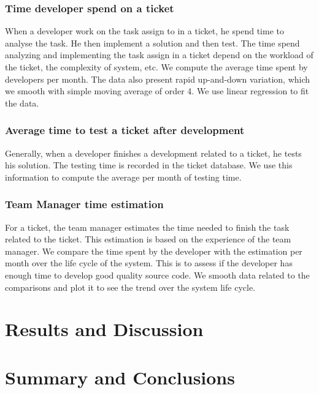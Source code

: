 \documentclass[10pt,conference]{IEEEtran}
\begin{document}
\subsubsection{Time developer spend on a ticket }
When a developer work on the task assign to in a ticket, he spend time to analyse  the task. He then implement a solution and then test. The time spend analyzing and implementing the task assign in a ticket depend on the workload  of the ticket, the complexity of system, etc.  
We compute the average time spent by developers per month. 
The data also present rapid up-and-down variation, which we smooth with simple moving average of order 4. We use  linear regression to fit the data.   
\subsubsection{Average time  to test a ticket after development}
Generally, when a developer finishes a development related to a ticket, he tests his solution.  
The testing time is recorded in the ticket database.
 We use this information to compute the average per month of testing time. 
 \subsubsection{Team Manager time estimation}
For a ticket, the team manager estimates the time needed to finish the task related to the ticket.
This estimation is based on the experience of the team manager.  
We compare the time spent by the developer with the estimation per month over the life cycle of the system.  
This is to assess if the developer has enough time to develop good quality source code.
 We smooth data related to the comparisons and plot it to see the trend over the system life cycle.
 \section{Results and Discussion}\label{sec:results-discussion}


  
\section{Summary and Conclusions}\label{sec:conclusion}

%



\vspace{12pt}
\end{document}
